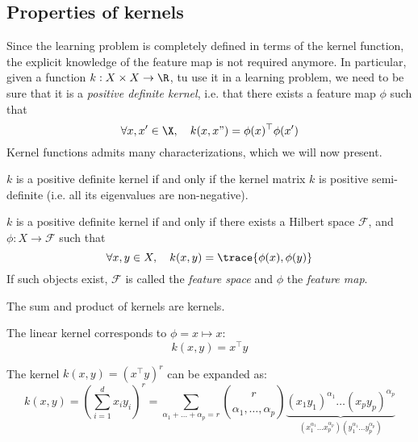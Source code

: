 \documentclass[toc]{../cs-classes/cs-classes}
\begin{document}
\subsection{Properties of kernels}
Since the learning problem is completely defined in terms of the kernel function, the explicit knowledge of the feature map is not required anymore. In particular, given a function $k:X\times X \to \R$, tu use it in a learning problem, we need to be sure that it is a \emph{positive definite kernel}, i.e. that there exists a feature map $\phi$ such that
\begin{equation*}
    \forall x, x'\in\X, \quad k(x, x") = \phi(x)^\top \phi(x')
\end{equation*}
Kernel functions admits many characterizations, which we will now present.

\begin{property}
    $k$ is a positive definite kernel if and only if the kernel matrix $k$ is positive semi-definite (i.e. all its eigenvalues are non-negative).
\end{property}

\begin{theorem}[Aronsazjn]
    $k$ is a positive definite kernel if and only if there exists a Hilbert space $\mathcal{F}$, and $\phi:X\to\mathcal{F}$ such that
    \begin{equation*}
        \forall x, y\in X, \quad k(x, y) = \trace{\phi(x), \phi(y)}
    \end{equation*}
    If such objects exist, $\mathcal{F}$ is called the \emph{feature space} and $\phi$ the \emph{feature map}.
\end{theorem}

\begin{property}
    The sum and product of kernels are kernels.
\end{property}

\begin{example}
    The linear kernel corresponds to $\phi = x \mapsto x$:
    \begin{equation*}
        k(x, y) = x^\top y
    \end{equation*}
\end{example}

\begin{example}
    The kernel $k(x, y) = (x^\top y)^r$ can be expanded as:
    \begin{equation*}
        k(x, y) = \left(\sum_{i=1}^d x_iy_i\right)^r = \sum_{\alpha_1 + \dots + \alpha_p=r} \binom{r}{\alpha_1, \dots, \alpha_p} \underbrace{(x_1y_1)^{\alpha_1} \dots (x_py_p)^{\alpha_p}}_{(x_1^{\alpha_1}\dots x_p^{\alpha_p})(y_1^{\alpha_1}\dots y_p^{\alpha_p})}
    \end{equation*}
\end{example}
\end{document}
